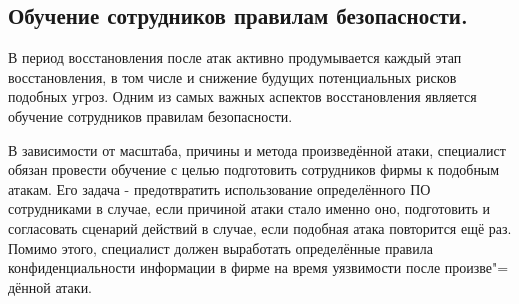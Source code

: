 \newpage
\subsection{Обучение сотрудников правилам безопасности.}

    В период восстановления после атак активно продумывается каждый этап восстановления, в том числе и снижение будущих
    потенциальных рисков подобных угроз. Одним из самых важных аспектов восстановления является обучение сотрудников правилам безопасности.
    
    В зависимости от масштаба, причины и метода произведённой атаки, специалист обязан провести обучение с целью подготовить сотрудников фирмы 
    к подобным атакам. Его задача - предотвратить использование определённого ПО сотрудниками в случае, если причиной атаки стало именно оно,
    подготовить и согласовать сценарий действий в случае, если подобная атака повторится ещё раз. Помимо этого, специалист должен выработать
    определённые правила конфиденциальности информации в фирме на время уязвимости после произве"=
    дённой атаки.




